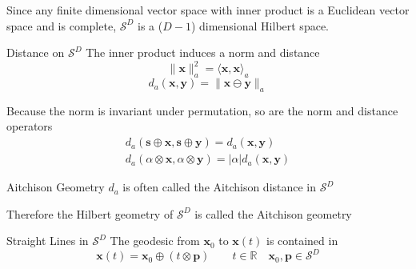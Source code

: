 \documentclass[dark]{cgem-presentation}
\begin{document}
\begin{frame}
	\LARGE
	Since any finite dimensional vector space with inner product
	is a Euclidean vector space and is complete, $\mathcal{S}^D$
	is a ($D-1$) dimensional Hilbert space. 
\end{frame}

\begin{frame}{Distance on $\mathcal{S}^D$}
	\LARGE
	\vspace{5mm}
	The inner product induces a norm and distance
	\begin{equation*}
		\| \mathbf{x} \|^2_a = \langle \mathbf{x}, \mathbf{x}
		\rangle_a
	\end{equation*}
	\begin{equation*}
		d_a(\mathbf{x}, \mathbf{y}) = \| \mathbf{x} \ominus
		\mathbf{y} \|_a
	\end{equation*}

	\vspace{5mm}
	Because the norm is invariant under permutation, so are
	the norm and distance operators
	\begin{gather*}
		d_a(\mathbf{s} \oplus \mathbf{x}, \mathbf{s} \oplus
		\mathbf{y}) = d_a(\mathbf{x}, \mathbf{y}) \\
		d_a(\alpha \otimes \mathbf{x}, \alpha \otimes
		\mathbf{y}) = |\alpha| d_a(\mathbf{x}, \mathbf{y})
	\end{gather*}
\end{frame}

\begin{frame}{Aitchison Geometry}
	\LARGE
	\vspace{1cm}
	$d_a$ is often called the \textcolor{ThirdColor}{Aitchison
	distance} in $\mathcal{S}^D$

	\vspace{5mm}
	Therefore the Hilbert geometry of $\mathcal{S}^D$ is called
	the \textcolor{ThirdColor}{Aitchison geometry}

	\vspace{3.18cm}
	\large
	\begin{flushright}
		\cite{Pawlowsky-Glahn2007}
	\end{flushright}
\end{frame}

\begin{frame}{Straight Lines in $\mathcal{S}^D$}
	\LARGE
	The \textcolor{SecondColor}{geodesic} from $\mathbf{x}_0$
	to $\mathbf{x}(t)$ is contained in
	\begin{equation*}
		\mathbf{x}(t) = \mathbf{x}_0 \oplus (t \otimes \mathbf{p})
		\quad \quad t \in \mathbb{R} \quad \mathbf{x}_0, \mathbf{p} \in
		\mathcal{S}^D
	\end{equation*}
\end{frame}
\end{document}
